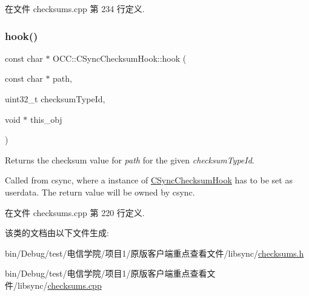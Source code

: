 在文件 checksums.\+cpp 第 234 行定义.

\mbox{\label{class_o_c_c_1_1_c_sync_checksum_hook_a960fe2cee59b5f4dc19ea89aa726ac3e}} 
\subsubsection{\texorpdfstring{hook()}{hook()}}
{\footnotesize\ttfamily const char $\ast$ O\+C\+C\+::\+C\+Sync\+Checksum\+Hook\+::hook (\begin{DoxyParamCaption}\item[{const char $\ast$}]{path,  }\item[{uint32\+\_\+t}]{checksum\+Type\+Id,  }\item[{void $\ast$}]{this\+\_\+obj }\end{DoxyParamCaption})\hspace{0.3cm}{\ttfamily [static]}}

Returns the checksum value for {\itshape path} for the given {\itshape checksum\+Type\+Id}.

Called from csync, where a instance of \hyperlink{class_o_c_c_1_1_c_sync_checksum_hook}{C\+Sync\+Checksum\+Hook} has to be set as userdata. The return value will be owned by csync. 

在文件 checksums.\+cpp 第 220 行定义.



该类的文档由以下文件生成\+:\begin{DoxyCompactItemize}
\item 
bin/\+Debug/test/电信学院/项目1/原版客户端重点查看文件/libsync/\hyperlink{checksums_8h}{checksums.\+h}\item 
bin/\+Debug/test/电信学院/项目1/原版客户端重点查看文件/libsync/\hyperlink{checksums_8cpp}{checksums.\+cpp}\end{DoxyCompactItemize}
